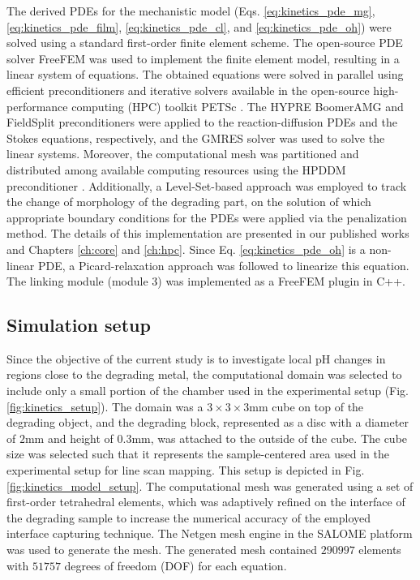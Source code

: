 The derived {PDE}s for the mechanistic model (Eqs. \ref{eq:kinetics_pde_mg}, \ref{eq:kinetics_pde_film}, \ref{eq:kinetics_pde_cl}, and \ref{eq:kinetics_pde_oh}) were solved using a standard first-order finite element scheme. The open-source {PDE} solver FreeFEM \cite{Hecht2012} was used to implement the finite element model, resulting in a linear system of equations. The obtained equations were solved in parallel using efficient preconditioners and iterative solvers available in the open-source high-performance computing ({HPC}) toolkit {PETSc} \cite{petsc}. The HYPRE BoomerAMG \cite{Falgout2002} and FieldSplit preconditioners were applied to the reaction-diffusion {PDE}s and the Stokes equations, respectively, and the {GMRES} solver \cite{Saad1986} was used to solve the linear systems. Moreover, the computational mesh was partitioned and distributed among available computing resources using the {HPDDM} preconditioner \cite{Jolivet2013}. Additionally, a Level-Set-based approach was employed to track the change of morphology of the degrading part, on the solution of which appropriate boundary conditions for the {PDE}s were applied via the penalization method. The details of this implementation are presented in our published works \cite{Barzegari2021, Barzegari2022} and Chapters \ref{ch:core} and \ref{ch:hpc}. Since Eq. \ref{eq:kinetics_pde_oh} is a non-linear {PDE}, a Picard-relaxation approach was followed to linearize this equation. The linking module (module 3) was implemented as a FreeFEM plugin in C++.

\subsection{Simulation setup}

Since the objective of the current study is to investigate local pH changes in regions close to the degrading metal, the computational domain was selected to include only a small portion of the chamber used in the experimental setup (Fig. \ref{fig:kinetics_setup}). The domain was a $3\times3\times3\text{mm}$ cube on top of the degrading object, and the degrading block, represented as a disc with a diameter of $2 \text{mm}$ and height of $0.3 \text{mm}$, was attached to the outside of the cube. The cube size was selected such that it represents the sample-centered area used in the experimental setup for line scan mapping. This setup is depicted in Fig. \ref{fig:kinetics_model_setup}. The computational mesh was generated using a set of first-order tetrahedral elements, which was adaptively refined on the interface of the degrading sample to increase the numerical accuracy of the employed interface capturing technique. The Netgen mesh engine \cite{Schoeberl1997} in the SALOME platform \cite{Ribes2007} was used to generate the mesh. The generated mesh contained $\num{290997}$ elements with $\num{51757}$ degrees of freedom ({DOF}) for each equation.



